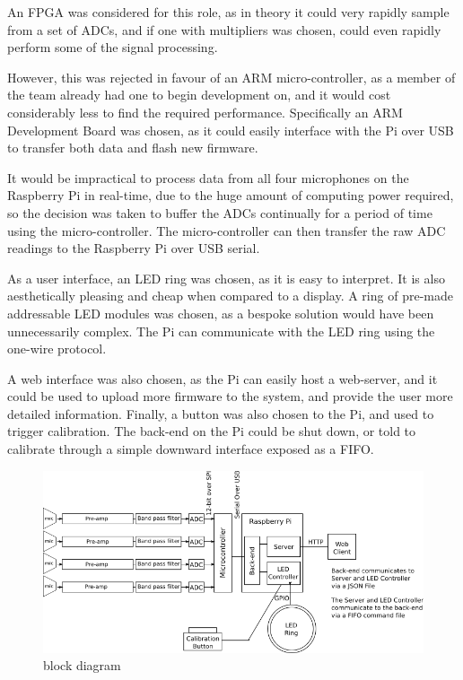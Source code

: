 \documentclass[a4paper]{article}
\begin{document}
An FPGA was considered for this role, as in theory it could very rapidly sample
from a set of ADCs, and if one with multipliers was chosen, could even rapidly
perform some of the signal processing.

However, this was rejected in favour of an ARM micro-controller, as a member of
the team already had one to begin development on, and it would cost considerably
less to find the required performance.  Specifically an ARM Development Board
was chosen, as it could easily interface with the Pi over USB to transfer both
data and flash new firmware.

It would be impractical to process data from all four microphones on the
Raspberry Pi in real-time, due to the huge amount of computing power required,
so the decision was taken to buffer the ADCs continually for a period of time
using the micro-controller. The micro-controller can then transfer the raw ADC
readings to the Raspberry Pi over USB serial.

As a user interface, an LED ring was chosen, as it is easy to interpret. It is
also aesthetically pleasing and cheap when compared to a display. A ring of
pre-made addressable LED modules was chosen, as a bespoke solution would have
been unnecessarily complex. The Pi can communicate with the LED ring using the
one-wire protocol.

A web interface was also chosen, as the Pi can easily host a web-server, and it
could be used to upload more firmware to the system, and provide the user more
detailed information.  Finally, a button was also chosen to the Pi, and used to
trigger calibration. The back-end on the Pi could be shut down, or told to
calibrate through a simple downward interface exposed as a FIFO.

\begin{figure}[H]
\begin{center}
\includegraphics[width=500pt]{appendixC/block_diagram.png}
\caption{block diagram}
\label{fig:blockdia}
\end{center}
\end{figure}
\end{document}
